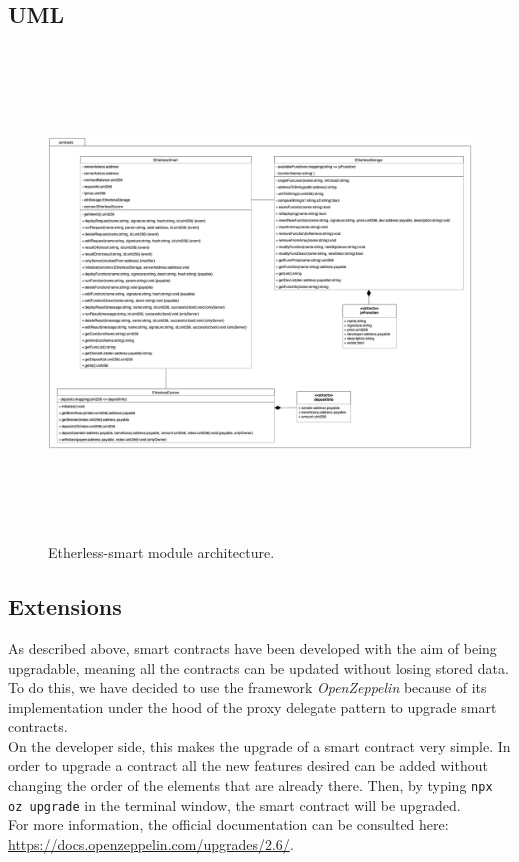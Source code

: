 	\begin{landscape}
	\subsection{UML}
		\begin{figure}[H]
			\centering
			\includegraphics[width=20cm, height=13cm]{./diagrammi/etherless-smart/Etherless-smart.jpg}
			\caption{Etherless-smart module architecture.}
		\end{figure}
	\end{landscape}
	\restoregeometry

\subsection{Extensions}  %
As described above, smart contracts have been developed with the aim of being upgradable, meaning all the contracts can be updated without losing stored data. \\
To do this, we have decided to use the framework \textit{OpenZeppelin} because of its implementation under the hood of the proxy delegate pattern to upgrade smart contracts. \\
On the developer side, this makes the upgrade of a smart contract very simple. In order to upgrade a contract all the new features desired can be added without changing the order of the elements that are already there. Then, by typing \texttt{npx oz upgrade} in the terminal window, the smart contract will be upgraded. \\
For more information, the official documentation can be consulted here: \url{https://docs.openzeppelin.com/upgrades/2.6/}.
